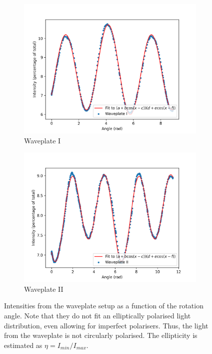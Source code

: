 \documentclass[11pt]{article}
\begin{document}
        \begin{figure}[H]
        \begin{subfigure}[b]{0.50\textwidth}
                \includegraphics[width=1.1\textwidth]{./wp_1.png}
                \caption{Waveplate I}
        \end{subfigure}
        \begin{subfigure}[b]{0.50\textwidth}
                \includegraphics[width=1.1\textwidth]{./wp_2.png}
                \caption{Waveplate II}
        \end{subfigure}
        \caption{Intensities from the waveplate setup as a function of the rotation angle. Note that they do not fit an elliptically polarised light
        distribution, even allowing for imperfect polarisers. Thus, the light from the waveplate is not circularly polarised. The ellipticity is
        estimated as $\eta = I_{min} / I_{max}$.}
        \label{fig:waveplates}
        \end{figure}
        
\end{document}
